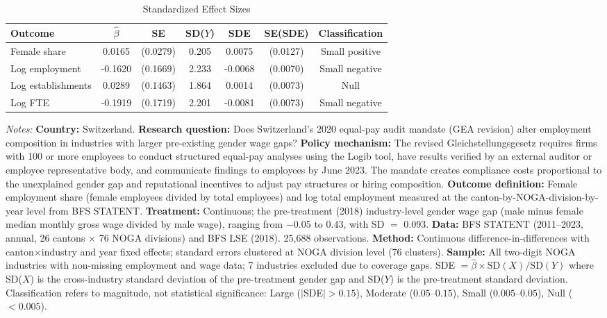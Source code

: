 \begin{table}[!htbp]
\centering
\caption{Standardized Effect Sizes}
\label{tab:sde}
\begin{tabular}{lcccccc}
\hline\hline
Outcome & $\hat{\beta}$ & SE & SD($Y$) & SDE & SE(SDE) & Classification \\
\hline
Female share & 0.0165 & (0.0279) & 0.205 & 0.0075 & (0.0127) & Small positive \\
Log employment & -0.1620 & (0.1669) & 2.233 & -0.0068 & (0.0070) & Small negative \\
Log establishments & 0.0289 & (0.1463) & 1.864 & 0.0014 & (0.0073) & Null \\
Log FTE & -0.1919 & (0.1719) & 2.201 & -0.0081 & (0.0073) & Small negative \\
\hline\hline
\end{tabular}
\vspace{0.2cm}
\parbox{\textwidth}{\footnotesize \textit{Notes:} \textbf{Country:} Switzerland. \textbf{Research question:} Does Switzerland's 2020 equal-pay audit mandate (GEA revision) alter employment composition in industries with larger pre-existing gender wage gaps? \textbf{Policy mechanism:} The revised Gleichstellungsgesetz requires firms with 100 or more employees to conduct structured equal-pay analyses using the Logib tool, have results verified by an external auditor or employee representative body, and communicate findings to employees by June 2023. The mandate creates compliance costs proportional to the unexplained gender gap and reputational incentives to adjust pay structures or hiring composition. \textbf{Outcome definition:} Female employment share (female employees divided by total employees) and log total employment measured at the canton-by-NOGA-division-by-year level from BFS STATENT. \textbf{Treatment:} Continuous; the pre-treatment (2018) industry-level gender wage gap (male minus female median monthly gross wage divided by male wage), ranging from $-$0.05 to 0.43, with SD $=$ 0.093. \textbf{Data:} BFS STATENT (2011--2023, annual, 26 cantons $\times$ 76 NOGA divisions) and BFS LSE (2018). 25,688 observations. \textbf{Method:} Continuous difference-in-differences with canton$\times$industry and year fixed effects; standard errors clustered at NOGA division level (76 clusters). \textbf{Sample:} All two-digit NOGA industries with non-missing employment and wage data; 7 industries excluded due to coverage gaps. SDE $= \hat{\beta} \times \text{SD}(X) / \text{SD}(Y)$ where SD($X$) is the cross-industry standard deviation of the pre-treatment gender gap and SD($Y$) is the pre-treatment standard deviation. Classification refers to magnitude, not statistical significance: Large ($|$SDE$| > 0.15$), Moderate ($0.05$--$0.15$), Small ($0.005$--$0.05$), Null ($< 0.005$).}
\end{table}
